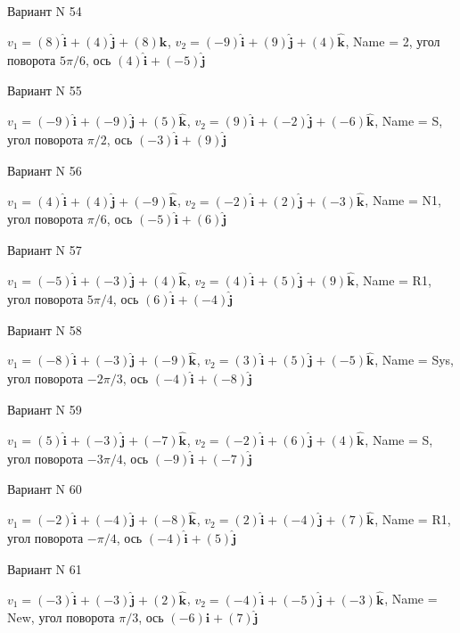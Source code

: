 \documentclass[11pt]{report}
\begin{document}
Вариант N 54

$v_1 = (8)\mathbf{\hat{i}_{}} + (4)\mathbf{\hat{j}_{}} + (8)\mathbf{\hat{k}_{}}$, $v_2 = (-9)\mathbf{\hat{i}_{}} + (9)\mathbf{\hat{j}_{}} + (4)\mathbf{\hat{k}_{}}$, Name = 2, угол поворота $5 \pi / 6$, ось $(4)\mathbf{\hat{i}_{}} + (-5)\mathbf{\hat{j}_{}}$

Вариант N 55

$v_1 = (-9)\mathbf{\hat{i}_{}} + (-9)\mathbf{\hat{j}_{}} + (5)\mathbf{\hat{k}_{}}$, $v_2 = (9)\mathbf{\hat{i}_{}} + (-2)\mathbf{\hat{j}_{}} + (-6)\mathbf{\hat{k}_{}}$, Name = S, угол поворота $\pi / 2$, ось $(-3)\mathbf{\hat{i}_{}} + (9)\mathbf{\hat{j}_{}}$

Вариант N 56

$v_1 = (4)\mathbf{\hat{i}_{}} + (4)\mathbf{\hat{j}_{}} + (-9)\mathbf{\hat{k}_{}}$, $v_2 = (-2)\mathbf{\hat{i}_{}} + (2)\mathbf{\hat{j}_{}} + (-3)\mathbf{\hat{k}_{}}$, Name = N1, угол поворота $\pi / 6$, ось $(-5)\mathbf{\hat{i}_{}} + (6)\mathbf{\hat{j}_{}}$

Вариант N 57

$v_1 = (-5)\mathbf{\hat{i}_{}} + (-3)\mathbf{\hat{j}_{}} + (4)\mathbf{\hat{k}_{}}$, $v_2 = (4)\mathbf{\hat{i}_{}} + (5)\mathbf{\hat{j}_{}} + (9)\mathbf{\hat{k}_{}}$, Name = R1, угол поворота $5 \pi / 4$, ось $(6)\mathbf{\hat{i}_{}} + (-4)\mathbf{\hat{j}_{}}$

Вариант N 58

$v_1 = (-8)\mathbf{\hat{i}_{}} + (-3)\mathbf{\hat{j}_{}} + (-9)\mathbf{\hat{k}_{}}$, $v_2 = (3)\mathbf{\hat{i}_{}} + (5)\mathbf{\hat{j}_{}} + (-5)\mathbf{\hat{k}_{}}$, Name = Sys, угол поворота $- 2 \pi / 3$, ось $(-4)\mathbf{\hat{i}_{}} + (-8)\mathbf{\hat{j}_{}}$

Вариант N 59

$v_1 = (5)\mathbf{\hat{i}_{}} + (-3)\mathbf{\hat{j}_{}} + (-7)\mathbf{\hat{k}_{}}$, $v_2 = (-2)\mathbf{\hat{i}_{}} + (6)\mathbf{\hat{j}_{}} + (4)\mathbf{\hat{k}_{}}$, Name = S, угол поворота $- 3 \pi / 4$, ось $(-9)\mathbf{\hat{i}_{}} + (-7)\mathbf{\hat{j}_{}}$

Вариант N 60

$v_1 = (-2)\mathbf{\hat{i}_{}} + (-4)\mathbf{\hat{j}_{}} + (-8)\mathbf{\hat{k}_{}}$, $v_2 = (2)\mathbf{\hat{i}_{}} + (-4)\mathbf{\hat{j}_{}} + (7)\mathbf{\hat{k}_{}}$, Name = R1, угол поворота $- \pi / 4$, ось $(-4)\mathbf{\hat{i}_{}} + (5)\mathbf{\hat{j}_{}}$

Вариант N 61

$v_1 = (-3)\mathbf{\hat{i}_{}} + (-3)\mathbf{\hat{j}_{}} + (2)\mathbf{\hat{k}_{}}$, $v_2 = (-4)\mathbf{\hat{i}_{}} + (-5)\mathbf{\hat{j}_{}} + (-3)\mathbf{\hat{k}_{}}$, Name = New, угол поворота $\pi / 3$, ось $(-6)\mathbf{\hat{i}_{}} + (7)\mathbf{\hat{j}_{}}$
\end{document}
